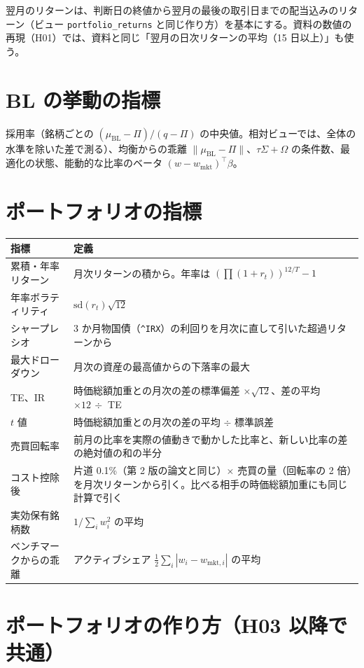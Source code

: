\documentclass[xelatex,ja=standard,jafont=haranoaji,a4paper,10pt,openany]{bxjsreport}
\newcommand{\code}[1]{\texttt{#1}}
\newcommand{\T}{^{\top}}
\newcommand{\muBL}{\mu_{\mathrm{BL}}}
\newcommand{\wmkt}{w_{\mathrm{mkt}}}
\begin{document}
翌月のリターンは、判断日の終値から翌月の最後の取引日までの配当込みのリターン（ビュー \code{portfolio\_returns} と同じ作り方）を基本にする。資料の数値の再現（H01）では、資料と同じ「翌月の日次リターンの平均（15 日以上）」も使う。

\section{BL の挙動の指標}

採用率（銘柄ごとの $(\muBL-\Pi)/(q-\Pi)$ の中央値。相対ビューでは、全体の水準を除いた差で測る）、均衡からの乖離 $\|\muBL-\Pi\|$、$\tau\Sigma+\Omega$ の条件数、最適化の状態、能動的な比率のベータ $(w-\wmkt)\T\beta$。

\section{ポートフォリオの指標}

\begin{longtable}{p{3.6cm}p{11.3cm}}
\toprule
\textbf{指標} & \textbf{定義} \\
\midrule
\endfirsthead
\bottomrule
\endfoot
累積・年率リターン & 月次リターンの積から。年率は $(\prod(1+r_t))^{12/T}-1$ \\
年率ボラティリティ & $\mathrm{sd}(r_t)\sqrt{12}$ \\
シャープレシオ & 3 か月物国債（\code{\^{}IRX}）の利回りを月次に直して引いた超過リターンから \\
最大ドローダウン & 月次の資産の最高値からの下落率の最大 \\
TE、IR & 時価総額加重との月次の差の標準偏差 $\times\sqrt{12}$、差の平均 $\times12\,\div$ TE \\
$t$ 値 & 時価総額加重との月次の差の平均 $\div$ 標準誤差 \\
売買回転率 & 前月の比率を実際の値動きで動かした比率と、新しい比率の差の絶対値の和の半分 \\
コスト控除後 & 片道 0.1\%（第 2 版の論文と同じ）$\times$ 売買の量（回転率の 2 倍）を月次リターンから引く。比べる相手の時価総額加重にも同じ計算で引く \\
実効保有銘柄数 & $1/\sum_i w_i^2$ の平均 \\
ベンチマークからの乖離 & アクティブシェア $\frac12\sum_i|w_i-w_{\mathrm{mkt},i}|$ の平均 \\
\end{longtable}

\section{ポートフォリオの作り方（H03 以降で共通）}
\end{document}

